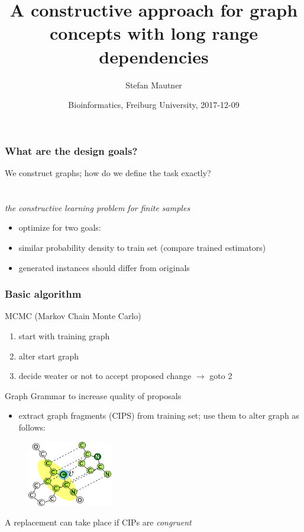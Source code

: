 \documentclass{beamer}
\title 
{A constructive approach for graph concepts
with long range dependencies}
\author %
{Stefan Mautner }
\date 
{Bioinformatics, Freiburg University, 2017-12-09}
\begin{document}
\frame{\titlepage}



\begin{frame}
\frametitle{What are the design goals?}

    We construct graphs; how do we define the task exactly?
    ~\\
    ~\\
    ~\\
    \emph{the constructive learning problem for finite samples} 
    ~\\
    \begin{itemize}
        \item optimize for two goals:
        \item similar probability density to train set (compare trained estimators)
        \item generated instances should  differ from originals
    \end{itemize}
\end{frame}


\begin{frame}
    \frametitle{Basic algorithm}
    MCMC (Markov Chain Monte Carlo)
    \begin{enumerate}
        \item start with training graph
        \item alter start graph
        \item decide weater or not to accept proposed change $\rightarrow$ goto 2
    \end{enumerate}
    Graph Grammar to increase quality of proposals
    \begin{itemize}
        \item extract graph fragments (CIPS) from training set;
            use them to alter graph as follows:
    \end{itemize}
    \begin{figure}[ht]
        \centering
        \includegraphics[width=0.33\textwidth]{images/CIP_replacement.png}
    \end{figure}
    \small{A replacement can take place if CIPs are \emph{congruent}  }
\end{frame}
\end{document}
